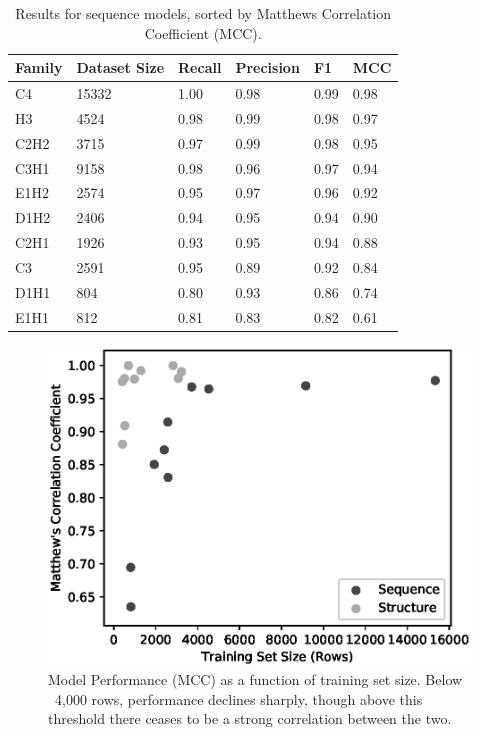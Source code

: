 \begin{table}
\caption[Sequence model performance]{\label{tab:sequence}Results for sequence models, sorted by
  Matthews Correlation Coefficient (MCC).}
\begin{center}
\begin{tabular}{llllll} \hline
Family & Dataset Size & Recall & Precision & F1    & MCC  \\ \hline
C4     & 15332        & 1.00   & 0.98      & 0.99  & 0.98 \\
H3     & 4524         & 0.98   & 0.99      & 0.98  & 0.97 \\
C2H2   & 3715         & 0.97   & 0.99      & 0.98  & 0.95 \\
C3H1   & 9158         & 0.98   & 0.96      & 0.97  & 0.94 \\
E1H2   & 2574         & 0.95   & 0.97      & 0.96  & 0.92 \\
D1H2   & 2406         & 0.94   & 0.95      & 0.94  & 0.90 \\
C2H1   & 1926         & 0.93   & 0.95      & 0.94  & 0.88 \\
C3     & 2591         & 0.95   & 0.89      & 0.92  & 0.84 \\
D1H1   & 804          & 0.80   & 0.93      & 0.86  & 0.74 \\
E1H1   & 812          & 0.81   & 0.83      & 0.82  & 0.61 \\ \hline
\end{tabular}
\end{center}
\end{table}

\begin{figure}
\centering
\includegraphics[width=1.0\textwidth]{Figures/size-score.eps}
\caption[Model Performance (MCC) as a function of training set size.]{\label{fig:size-score} Model Performance (MCC) as a function
  of training set size. Below ~4,000 rows, performance declines
  sharply, though above this threshold there ceases to be a strong
  correlation between the two.}
\end{figure}


